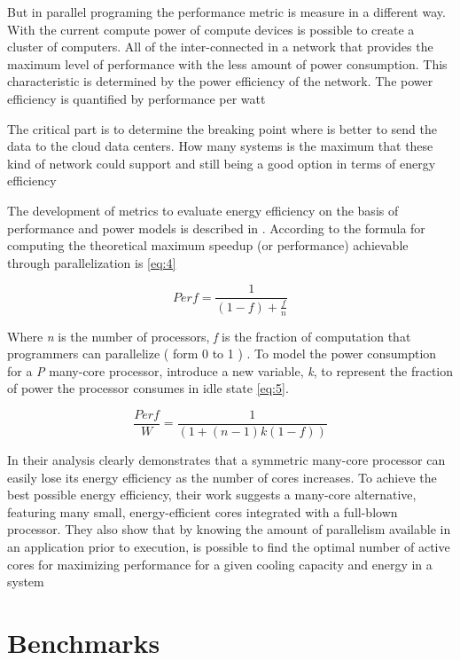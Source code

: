 But in parallel programing the performance metric is measure in a different
way.  With the current compute power of compute devices is possible to create a
cluster of computers. All of the inter-connected in a network that provides the
maximum level of performance with the less amount of power consumption. This
characteristic is determined by the power efficiency of the network. The power
efficiency is quantified by performance per watt \cite{Jun}

The critical part is to determine the breaking point where is better to send
the data to the cloud data centers. How many systems is the maximum that these
kind of network could support and still being a good option in terms of energy
efficiency

The development of metrics to evaluate energy efficiency on the basis of
performance and power models is described in \cite{Dong}. According to
\cite{Dong} the formula for computing the theoretical maximum speedup (or
performance) achievable through parallelization is \ref{eq:4}

\begin{equation}\label{eq:4}
Perf = \frac{1}{(1 - f) + \frac{f}{n}}
\end{equation}

Where \textit{n} is the number of processors,  \textit{f} is the fraction of
computation that programmers can parallelize  ( form 0 to 1 ) . To model the
power consumption for a \textit{P} many-core processor, \cite{Dong} introduce a
new variable, \textit{k}, to represent the fraction of power the processor
consumes in idle state \ref{eq:5}. 

\begin{equation}\label{eq:5}
\frac{Perf}{W} = \frac{1}{(1 + (n -1 ) k (1 - f))}
\end{equation}

In \cite{Dong} their analysis clearly demonstrates that a symmetric many-core
processor can easily  lose its energy efficiency as the number of cores
increases. To achieve the  best possible energy efficiency, their  work
suggests a many-core alternative, featuring many small, energy-efficient cores
integrated with a full-blown processor. They also show that by knowing the
amount of parallelism available in an application prior to execution, is
possible to  find the optimal number of active cores for maximizing performance
for a given cooling capacity and energy in a system

\section{Benchmarks}

